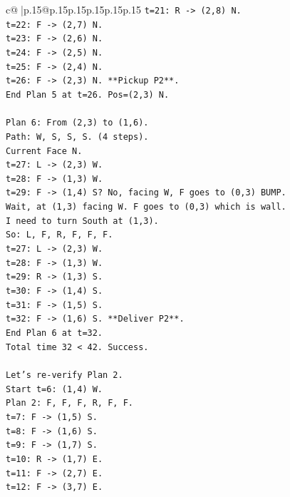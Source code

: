 \documentclass{article}
\begin{document}
{\begin{supertabular}{c@{$\;$}|p{.15\linewidth}@{}p{.15\linewidth}p{.15\linewidth}p{.15\linewidth}p{.15\linewidth}p{.15\linewidth}}
{{{\texttt{t=21: R {-}> (2,8) N.} \\
\texttt{t=22: F {-}> (2,7) N.} \\
\texttt{t=23: F {-}> (2,6) N.} \\
\texttt{t=24: F {-}> (2,5) N.} \\
\texttt{t=25: F {-}> (2,4) N.} \\
\texttt{t=26: F {-}> (2,3) N. **Pickup P2**.} \\
\texttt{End Plan 5 at t=26. Pos=(2,3) N.} \\
\\ 
\texttt{Plan 6: From (2,3) to (1,6).} \\
\texttt{Path: W, S, S, S. (4 steps).} \\
\texttt{Current Face N.} \\
\texttt{t=27: L {-}> (2,3) W.} \\
\texttt{t=28: F {-}> (1,3) W.} \\
\texttt{t=29: F {-}> (1,4) S? No, facing W, F goes to (0,3) BUMP.} \\
\texttt{Wait, at (1,3) facing W. F goes to (0,3) which is wall.} \\
\texttt{I need to turn South at (1,3).} \\
\texttt{So: L, F, R, F, F, F.} \\
\texttt{t=27: L {-}> (2,3) W.} \\
\texttt{t=28: F {-}> (1,3) W.} \\
\texttt{t=29: R {-}> (1,3) S.} \\
\texttt{t=30: F {-}> (1,4) S.} \\
\texttt{t=31: F {-}> (1,5) S.} \\
\texttt{t=32: F {-}> (1,6) S. **Deliver P2**.} \\
\texttt{End Plan 6 at t=32.} \\
\texttt{Total time 32 < 42. Success.} \\
\\ 
\texttt{Let's re{-}verify Plan 2.} \\
\texttt{Start t=6: (1,4) W.} \\
\texttt{Plan 2: F, F, F, R, F, F.} \\
\texttt{t=7: F {-}> (1,5) S.} \\
\texttt{t=8: F {-}> (1,6) S.} \\
\texttt{t=9: F {-}> (1,7) S.} \\
\texttt{t=10: R {-}> (1,7) E.} \\
\texttt{t=11: F {-}> (2,7) E.} \\
\texttt{t=12: F {-}> (3,7) E.} \\
}}}
\end{supertabular}}
\end{document}
